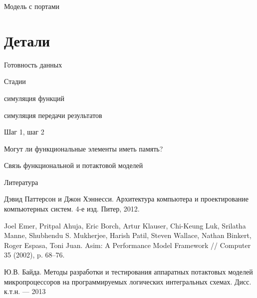 \documentclass{beamer}
\begin{document}
\begin{frame}{Модель с портами}

\end{frame}

\section{Детали}

\begin{frame}{Готовность данных}

\end{frame}

\begin{frame}{Стадии}


 симуляция функций

 симуляция передачи результатов

\end{frame}

\begin{frame}{Шаг 1, шаг 2}

\end{frame}


\begin{frame}{Могут ли функциональные элементы иметь память?}

\end{frame}

\begin{frame}{Связь функциональной и потактовой моделей}

\end{frame}

% 


\begin{frame}[allowframebreaks]{Литература}
\begin{thebibliography}{99}
     Дэвид Паттерсон и Джон Хэннесси. Архитектура компьютера и проектирование компьютерных
систем. 4-е изд. Питер, 2012.

 Joel Emer, Pritpal Ahuja, Eric Borch, Artur Klauser, Chi-Keung Luk, Srilatha Manne, Shubhendu S. Mukherjee,
Harish Patil, Steven Wallace, Nathan Binkert, Roger Espasa, Toni Juan. Asim: A Performance Model Framework // Computer 35 (2002), p. 68–76.

 Ю.В. Байда. Методы разработки и тестирования аппаратных потактовых моделей микропроцессоров на программируемых логических интегральных схемах. Дисс. к.т.н. — 2013
\end{thebibliography}
\end{frame}
\end{document}
